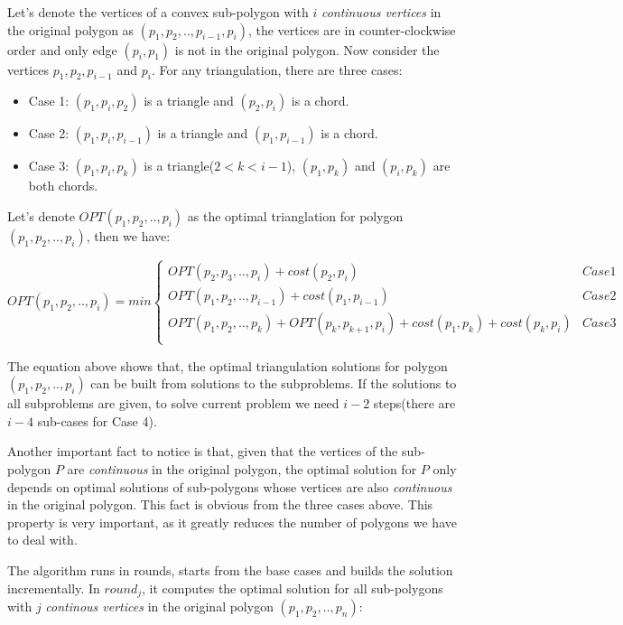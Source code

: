 Let's denote the vertices of a convex sub-polygon with $i$ \textit{continuous vertices} in the original polygon as $(p_1, p_2, .., p_{i-1}, p_i)$, the vertices are in counter-clockwise order and only edge $(p_i, p_1)$ is not in the original polygon. Now consider the vertices $p_1, p_2, p_{i-1}$ and $p_i$. For any triangulation, there are three cases:

\begin{itemize}
\item{Case 1}: $(p_1, p_i, p_2)$ is a triangle and $(p_2, p_i)$ is a chord.
\item{Case 2}: $(p_1, p_i, p_{i-1})$ is a triangle and  $(p_1, p_{i-1})$ is a chord.
\item{Case 3}: $(p_1, p_i, p_k)$ is a triangle($2 < k < i-1$), $(p_1, p_k)$ and $(p_i, p_k)$ are both chords.
\end{itemize}

Let's denote $OPT(p_1, p_2, .., p_i)$ as the optimal trianglation for polygon $(p_1, p_2, .., p_i)$, then we have:

\[
OPT(p_1, p_2, .., p_i) = min \left\{
  \begin{array}{ll}
    OPT(p_2, p_3, .., p_i) + cost(p_2, p_i) & Case 1 \\
    OPT(p_1, p_2, .., p_{i-1}) + cost(p_1, p_{i-1})  & Case 2 \\
    OPT(p_1, p_2, .., p_k) + OPT(p_k, p_{k+1}, p_i) + cost(p_1, p_k) + cost(p_k, p_i)  & Case 3 \\
  \end{array}\right.
\]

The equation above shows that, the optimal triangulation solutions for polygon $(p_1, p_2, .., p_i)$ can be built from solutions to the subproblems. If the solutions to all subproblems are given, to solve current problem we need $i-2$ steps(there are $i-4$ sub-cases for Case 4).

Another important fact to notice is that, given that the vertices of the sub-polygon $P$ are \textit{continuous} in the original polygon, the optimal solution for $P$ only depends on optimal solutions of sub-polygons whose vertices are also \textit{continuous} in the original polygon. This fact is obvious from the three cases above. This property is very important, as it greatly reduces the number of polygons we have to deal with.

The algorithm runs in rounds, starts from the base cases and builds the solution incrementally. In $round_j$, it computes the optimal solution for all sub-polygons with $j$ \textit{continous vertices} in the original polygon $(p_1, p_2, .., p_n)$:

